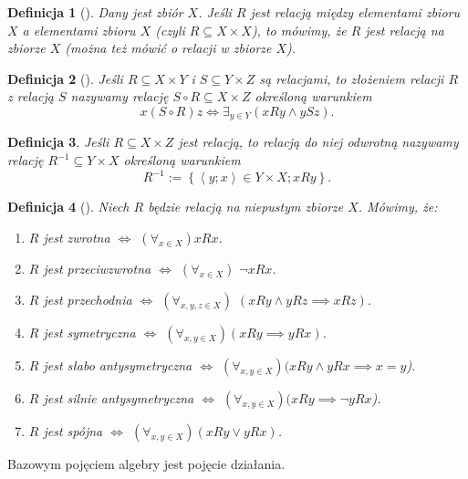\documentclass[12pt,a4paper]{report}
\newtheorem{definition}{Definicja}
\newcommand{\parauporzadkowana}[2]{\left\langle {#1}; {#2} \right\rangle}
\newcommand{\zbior}[1]{\left\lbrace {#1} \right\rbrace }
\begin{document}
\begin{definition}[\citep{kraszewski2007wstkep}]
Dany jest zbiór $X$. Jeśli $R$ jest relacją między elementami zbioru $X$ a elementami zbioru $X$ (czyli $R\subseteq X \times X$), to mówimy, że $R$ jest relacją na zbiorze $X$ (można też mówić o relacji w zbiorze $X$).
\end{definition}

\begin{definition}[\citep{kraszewski2007wstkep}]
Jeśli $R\subseteq X\times Y$ i $S\subseteq Y \times Z$ są relacjami, to złożeniem relacji $R$ z relacją $S$ nazywamy relację $S\circ R \subseteq X \times Z$ określoną warunkiem
\begin{equation*}
x(S\circ R)z \iff \exists_{y \in Y} (xRy \land ySz).
\end{equation*}
\end{definition}
\begin{definition}
Jeśli $R \subseteq X \times Z$ jest relacją, to relacją do niej odwrotną nazywamy relację $R^{-1} \subseteq Y \times X$ określoną warunkiem 
\begin{equation*}
R^{-1} := \zbior{\parauporzadkowana{y}{x} \in Y \times X; xRy}.
\end{equation*}
\end{definition}

\begin{definition}[\citep{kraszewski2007wstkep}]
Niech $R$ będzie relacją na niepustym zbiorze $X$. Mówimy, że:
\begin{enumerate}
\item
$R$ jest zwrotna $\iff$ $(\forall_{x\in X}) xRx$.
\item
$R$ jest przeciwzwrotna $\iff$ $(\forall_{x\in X})$ $\neg xRx$.
\item
$R$ jest przechodnia $\iff$ $(\forall_{x,y,z\in X})$ $(xRy\land yRz  \implies xRz)$.
\item
$R$ jest symetryczna $\iff$ $(\forall_{x,y\in X})(xRy \implies yRx)$. 
\item
$R$ jest słabo antysymetryczna $\iff$ $(\forall_{x,y\in X})( xRy \land yRx \implies x=y$).
\item
$R$ jest silnie antysymetryczna $\iff$ $(\forall_{x,y\in X})(xRy \implies \neg yRx$).
\item
$R$ jest spójna $\iff$ $(\forall_{x,y\in X})(xRy \lor yRx)$.

\end{enumerate}
\end{definition}
Bazowym pojęciem algebry jest pojęcie działania.
\end{document}
